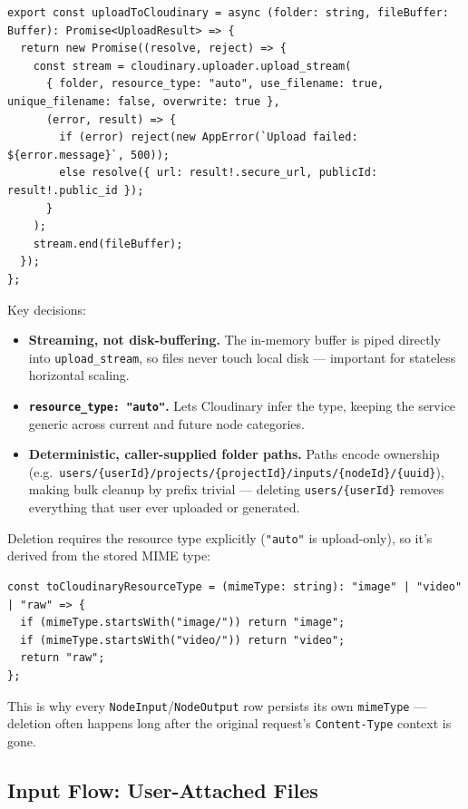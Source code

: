 \begin{lstlisting}
export const uploadToCloudinary = async (folder: string, fileBuffer: Buffer): Promise<UploadResult> => {
  return new Promise((resolve, reject) => {
    const stream = cloudinary.uploader.upload_stream(
      { folder, resource_type: "auto", use_filename: true, unique_filename: false, overwrite: true },
      (error, result) => {
        if (error) reject(new AppError(`Upload failed: ${error.message}`, 500));
        else resolve({ url: result!.secure_url, publicId: result!.public_id });
      }
    );
    stream.end(fileBuffer);
  });
};
\end{lstlisting}

Key decisions:
\begin{itemize}
  \item \textbf{Streaming, not disk-buffering.} The in-memory buffer is piped directly into \texttt{upload\_stream}, so files never touch local disk — important for stateless horizontal scaling.
  \item \textbf{\texttt{resource\_type: "auto"}.} Lets Cloudinary infer the type, keeping the service generic across current and future node categories.
  \item \textbf{Deterministic, caller-supplied folder paths.} Paths encode ownership (e.g.\ \texttt{users/\{userId\}/projects/\{projectId\}/inputs/\{nodeId\}/\{uuid\}}), making bulk cleanup by prefix trivial — deleting \texttt{users/\{userId\}} removes everything that user ever uploaded or generated.
\end{itemize}

Deletion requires the resource type explicitly (\texttt{"auto"} is upload-only), so it's derived from the stored MIME type:

\begin{lstlisting}
const toCloudinaryResourceType = (mimeType: string): "image" | "video" | "raw" => {
  if (mimeType.startsWith("image/")) return "image";
  if (mimeType.startsWith("video/")) return "video";
  return "raw";
};
\end{lstlisting}

This is why every \texttt{NodeInput}/\texttt{NodeOutput} row persists its own \texttt{mimeType} — deletion often happens long after the original request's \texttt{Content-Type} context is gone.

\subsection{Input Flow: User-Attached Files}
\label{subsec:input-flow}

